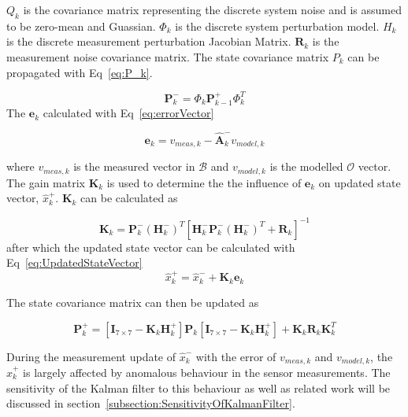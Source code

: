 $Q_k$ is the covariance matrix representing the discrete system noise and is assumed to be zero-mean and Guassian. $\Phi_k$ is the discrete system perturbation model. $H_k$ is the discrete measurement perturbation Jacobian Matrix. $\mathbf{R}_k$ is the measurement noise covariance matrix. The state covariance matrix $P_k$ can be propagated with Eq~\ref{eq:P_k}.

\begin{equation}
	\mathbf{P}_k^- = \Phi_k \mathbf{P}_{k-1}^+ \Phi_k ^T
	\label{eq:P_k}
\end{equation}
The $\mathbf{e}_k$ calculated with Eq~\ref{eq:errorVector}

\begin{equation}
	\mathbf{e}_k = v_{meas,k} - \hat{\boldsymbol{A}}_k^- v_{model,k}
	\label{eq:errorVector}
\end{equation}

where $v_{meas,k}$ is the measured vector in $\mathbf{\mathcal{B}}$ and $v_{model,k}$ is the modelled $\mathbf{\mathcal{O}}$ vector. The gain matrix $\mathbf{K}_k$ is used to determine the the influence of $\mathbf{e}_k$ on updated state vector, $\hat{x}_k^+$. $\mathbf{K}_k$ can be calculated as 

\begin{equation}
	\mathbf{K}_k = \mathbf{P}_k^- (\mathbf{H}_k^-)^T \left[\mathbf{H}_k^- \mathbf{P}_k^- (\mathbf{H}_k^-)^T + \mathbf{R}_k \right]^{-1}
\end{equation}
after which the updated state vector can be calculated with Eq~\ref{eq:UpdatedStateVector}
\begin{equation}
	\hat{x}_k^+ = \hat{x}_k^- + \mathbf{K}_k \mathbf{e}_k
	\label{eq:UpdatedStateVector}
\end{equation}

The state covariance matrix can then be updated as

\begin{equation}
	\mathbf{P}_k^+ = \left[\mathbf{I}_{7 \times 7} - \mathbf{K}_k \mathbf{H}_k^+ \right]\mathbf{P}_k \left[\mathbf{I}_{7 \times 7} - \mathbf{K}_k \mathbf{H}_k^+ \right] + \mathbf{K}_k \mathbf{R}_k \mathbf{K}_k^T
	\label{eq:Updated_P_k}
\end{equation}

During the measurement update of $\hat{x}_k^-$ with the error of $v_{meas,k}$ and $v_{model,k}$, the $\hat{x}_k^+$ is largely affected by anomalous behaviour in the sensor measurements. The sensitivity of the Kalman filter to this behaviour as well as related work will be discussed in section~\ref{subsection:SensitivityOfKalmanFilter}.

